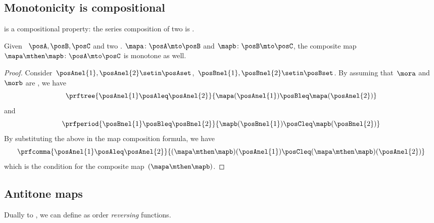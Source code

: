 

\subsection{Monotonicity is compositional}

 is a compositional property: the series composition of two  is .
\begin{lemma}\label{lem:monotonicity-compositional}
    Given ~$\posA,\posB,\posC$ and two .
    $\mapa\colon \posA \mto \posB$ and $\mapb\colon \posB \mto \posC$, the composite map~$\mapa\mthen \mapb\colon \posA \mto \posC$ is monotone as well.
\end{lemma}
\begin{proof}
    Consider~$\posAnel{1},\posAnel{2} \setin \posAset$,~$\posBnel{1},\posBnel{2}\setin \posBset$.
    By assuming that~$\mora$ and~$\morb$ are , we have
    \begin{equation}\label{eq:monotonicity-compositional-1}
        \prftree{\posAnel{1}\posAleq \posAnel{2}}{\mapa(\posAnel{1})\posBleq \mapa(\posAnel{2})}
    \end{equation}
    and
    \begin{equation}\label{eq:monotonicity-compositional-2}
        \prfperiod{\posBnel{1}\posBleq \posBnel{2}}{\mapb(\posBnel{1})\posCleq \mapb(\posBnel{2})}
    \end{equation}
    By substituting the above in the map composition formula, we have
    \begin{equation}\label{eq:monotonicity-compositional-3}
        \prfcomma{\posAnel{1}\posAleq \posAnel{2} }{ (\mapa\mthen \mapb)(\posAnel{1}) \posCleq (\mapa\mthen \mapb)(\posAnel{2})}
    \end{equation}
    which is the  condition for the composite map~$(\mapa\mthen\mapb)$.
\end{proof}


\subsection{Antitone maps}

Dually to , we can define  as order \emph{reversing} functions.

